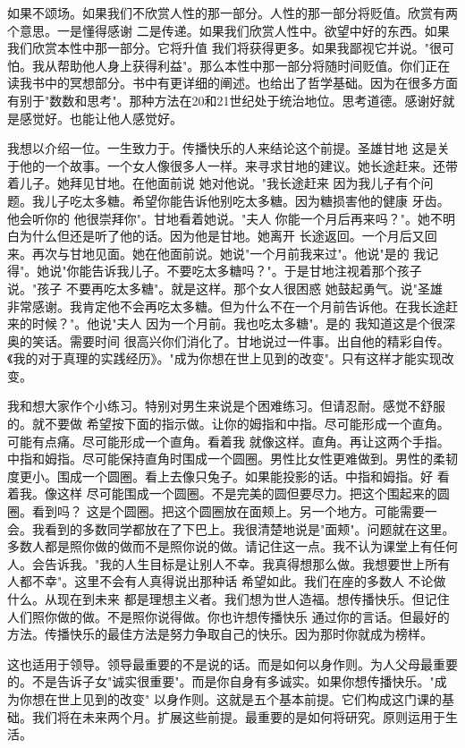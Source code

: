如果不颂场。如果我们不欣赏人性的那一部分。人性的那一部分将贬值。欣赏有两个意思。一是懂得感谢 二是传递。如果我们欣赏人性中。欲望中好的东西。如果我们欣赏本性中那一部分。它将升值 我们将获得更多。如果我鄙视它并说。"很可怕。我从帮助他人身上获得利益"。那么本性中那一部分将随时间贬值。你们正在读我书中的冥想部分。书中有更详细的阐述。也给出了哲学基础。因为在很多方面有别于"数数和思考"。那种方法在20和21世纪处于统治地位。思考道德。感谢好就是感觉好。也能让他人感觉好。 

我想以介绍一位。一生致力于。传播快乐的人来结论这个前提。圣雄甘地 这是关于他的一个故事。一个女人像很多人一样。来寻求甘地的建议。她长途赶来。还带着儿子。她拜见甘地。在他面前说 她对他说。"我长途赶来 因为我儿子有个问题。我儿子吃太多糖。希望你能告诉他别吃太多糖。因为糖损害他的健康 牙齿。他会听你的 他很崇拜你"。甘地看着她说。"夫人 你能一个月后再来吗？"。她不明白为什么但还是听了他的话。因为他是甘地。她离开 长途返回。一个月后又回来。再次与甘地见面。她在他面前说。她说"一个月前我来过"。他说"是的 我记得"。她说"你能告诉我儿子。不要吃太多糖吗？"。于是甘地注视着那个孩子说。"孩子 不要再吃太多糖"。就是这样。那个女人很困惑 她鼓起勇气。说"圣雄 非常感谢。我肯定他不会再吃太多糖。但为什么不在一个月前告诉他。在我长途赶来的时候？"。他说"夫人 因为一个月前。我也吃太多糖"。是的 我知道这是个很深奥的笑话。需要时间 很高兴你们消化了。甘地说过一件事。出自他的精彩自传。《我的对于真理的实践经历》。"成为你想在世上见到的改变"。只有这样才能实现改变。 

我和想大家作个小练习。特别对男生来说是个困难练习。但请忍耐。感觉不舒服的。就不要做 希望按下面的指示做。让你的姆指和中指。尽可能形成一个直角。可能有点痛。尽可能形成一个直角。看着我 就像这样。直角。再让这两个手指。中指和姆指。尽可能保持直角时围成一个圆圈。男性比女性更难做到。男性的柔韧度更小。围成一个圆圈。看上去像只兔子。如果能投影的话。中指和姆指。好 看着我。像这样 尽可能围成一个圆圈。不是完美的圆但要尽力。把这个围起来的圆圈。看到吗？ 这是个圆圈。把这个圆圈放在面颊上。另一个地方。可能需要一会。我看到的多数同学都放在了下巴上。我很清楚地说是"面颊"。问题就在这里。多数人都是照你做的做而不是照你说的做。请记住这一点。我不认为课堂上有任何人。会告诉我。"我的人生目标是让别人不幸。我真得想那么做。我想要世上所有人都不幸"。这里不会有人真得说出那种话 希望如此。我们在座的多数人 不论做什么。从现在到未来 都是理想主义者。我们想为世人造福。想传播快乐。但记住 人们照你做的做。不是照你说得做。你也许想传播快乐 通过你的言话。但最好的方法。传播快乐的最佳方法是努力争取自己的快乐。因为那时你就成为榜样。 

这也适用于领导。领导最重要的不是说的话。而是如何以身作则。为人父母最重要的。不是告诉子女"诚实很重要"。而是你自身有多诚实。如果你想传播快乐。"成为你想在世上见到的改变" 以身作则。这就是五个基本前提。它们构成这门课的基础。我们将在未来两个月。扩展这些前提。最重要的是如何将研究。原则运用于生活。 

